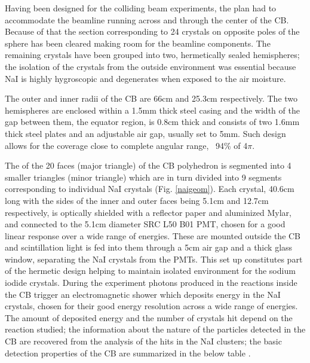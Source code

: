\indent Having  been  designed  for  the  colliding  beam  experiments,  the  plan  had  to accommodate  the  beamline  running  across  and  through the  center  of  the  CB. Because of that the section corresponding to 24 crystals on opposite poles of the sphere  has  been  cleared  making  room  for  the  beamline  components.  The remaining crystals have been grouped into two, hermetically sealed hemispheres; the isolation of the crystals from the outside environment was essential because NaI is highly hygroscopic and degenerates when exposed to the air moisture.

\indent The outer and inner radii of the CB are 66cm and 25.3cm respectively. The two hemispheres are enclosed within a 1.5mm thick steel casing and the width of the gap between them, the equator region, is 0.8cm thick and consists of two 1.6mm thick steel plates and an adjustable air gap, usually set to 5mm. Such design allows for the coverage close to complete angular range, ~94\% of 4$\pi$.

\indent The of the 20 faces (major triangle) of the CB polyhedron is segmented into 4 smaller triangles (minor triangle)  which  are in turn divided into 9 segments corresponding to individual NaI crystals (Fig. \ref{naigeom}). Each crystal, 40.6cm long with the sides of the inner and outer faces being 5.1cm and 12.7cm respectively, is optically shielded with a reflector paper and aluminized Mylar, and connected to the 5.1cm diameter SRC L50 B01 PMT, chosen for a good linear response over a wide range of energies. These are mounted outside the CB and scintillation light is fed into them through a 5cm air gap and a thick glass window, separating the NaI crystals from the PMTs. This set up constitutes part of the hermetic design helping to maintain isolated environment for the sodium iodide crystals. During the experiment photons produced in the reactions inside the CB trigger an electromagnetic shower which deposits energy in the NaI crystals, chosen for their good energy resolution across a wide range of energies. The amount of deposited energy and the number of crystals hit depend on the reaction studied; the  information  about  the  nature  of  the  particles  detected  in  the  CB  are recovered from the analysis of the hits in the NaI clusters; the basic detection properties  of  the  CB  are  summarized  in  the  below  table \cite {starostin}.
 

